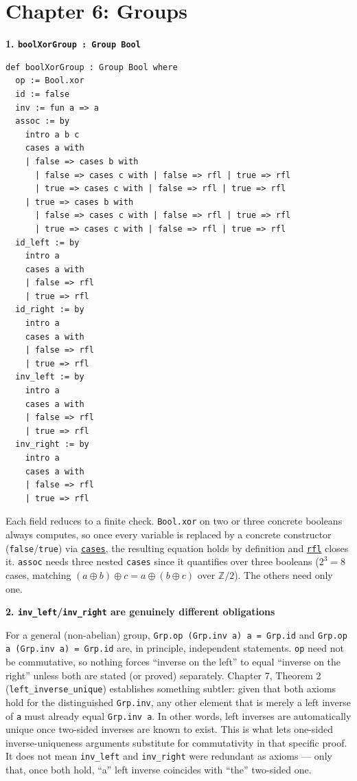 \section{Chapter 6: Groups}\label{sec:14-appendix-solutions:05-chapter-6:1}

\textbf{1. \texttt{boolXorGroup : Group Bool}}

\begin{lstlisting}
def boolXorGroup : Group Bool where
  op := Bool.xor
  id := false
  inv := fun a => a
  assoc := by
    intro a b c
    cases a with
    | false => cases b with
      | false => cases c with | false => rfl | true => rfl
      | true => cases c with | false => rfl | true => rfl
    | true => cases b with
      | false => cases c with | false => rfl | true => rfl
      | true => cases c with | false => rfl | true => rfl
  id_left := by
    intro a
    cases a with
    | false => rfl
    | true => rfl
  id_right := by
    intro a
    cases a with
    | false => rfl
    | true => rfl
  inv_left := by
    intro a
    cases a with
    | false => rfl
    | true => rfl
  inv_right := by
    intro a
    cases a with
    | false => rfl
    | true => rfl
\end{lstlisting}

Each field reduces to a finite check. \texttt{Bool.xor} on two or three concrete booleans always computes, so once every variable is replaced by a concrete constructor (\texttt{false}/\texttt{true}) via \href{https://lean-lang.org/doc/reference/latest/Tactic-Proofs/Tactic-Reference/}{\texttt{cases}}, the resulting equation holds by definition and \href{https://lean-lang.org/doc/reference/latest/Tactic-Proofs/Tactic-Reference/}{\texttt{rfl}} closes it. \texttt{assoc} needs three nested \texttt{cases} since it quantifies over three booleans (\(2^3 = 8\) cases, matching \((a \oplus b) \oplus c = a \oplus (b \oplus c)\) over \(\mathbb{Z}/2\)). The others need only one.

\textbf{2. \texttt{inv\_\allowbreak{}left}/\texttt{inv\_\allowbreak{}right} are genuinely different obligations}

For a general (non-abelian) group, \texttt{Grp.op (Grp.inv a) a = Grp.id} and \texttt{Grp.op a (Grp.inv a) = Grp.id} are, in principle, independent statements. \texttt{op} need not be commutative, so nothing forces ``inverse on the left'' to equal ``inverse on the right'' unless both are stated (or proved) separately. Chapter 7, Theorem 2 (\texttt{left\_\allowbreak{}inverse\_\allowbreak{}unique}) establishes something subtler: given that both axioms hold for the distinguished \texttt{Grp.inv}, any other element that is merely a left inverse of \texttt{a} must already equal \texttt{Grp.inv a}. In other words, left inverses are automatically unique once two-sided inverses are known to exist. This is what lets one-sided inverse-uniqueness arguments substitute for commutativity in that specific proof. It does not mean \texttt{inv\_\allowbreak{}left} and \texttt{inv\_\allowbreak{}right} were redundant as axioms --- only that, once both hold, ``a'' left inverse coincides with ``the'' two-sided one.
